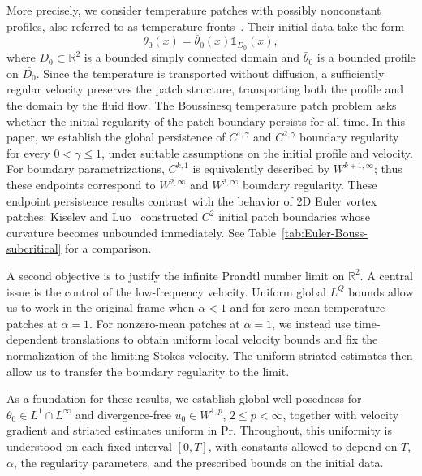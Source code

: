 \documentclass[reqno,11pt,a4paper]{amsart}
\begin{document}
More precisely, we consider temperature patches
with possibly nonconstant profiles,
also referred to as temperature fronts~\cite{Gil82,AJM03}.
Their initial data take the form 
\[
  \theta_0(x)=\bar\theta_0(x)\mathds{1}_{D_0}(x),
\]
where $D_0\subset\mathbb R^2$ is a bounded simply connected
domain and $\bar\theta_0$ is a bounded profile on
$\overline{D_0}$.
Since the temperature is transported without diffusion,
a sufficiently regular velocity preserves the patch structure,
transporting both the profile and the domain by the fluid flow.
The Boussinesq temperature patch problem asks whether
the initial regularity of the patch boundary persists
for all time.
In this paper, we establish the global persistence of
$C^{1,\gamma}$ and $C^{2,\gamma}$ boundary regularity
for every $0<\gamma\leq1$, under suitable assumptions
on the initial profile and velocity.
For boundary parametrizations, $C^{k,1}$ is equivalently described by $W^{k+1,\infty}$; 
thus these endpoints correspond to $W^{2,\infty}$ and $W^{3,\infty}$ boundary regularity.
These endpoint persistence results contrast with
the behavior of 2D Euler vortex patches:
Kiselev and Luo~\cite{KL23} constructed
$C^2$ initial patch boundaries whose curvature
becomes unbounded immediately.
See Table~\ref{tab:Euler-Bouss-subcritical}
for a comparison.

A second objective is to justify the infinite Prandtl
number limit on $\mathbb R^2$.
A central issue is the control of the low-frequency velocity.
Uniform global $L^Q$ bounds allow us to work
in the original frame when $\alpha<1$
and for zero-mean temperature patches at $\alpha=1$.
For nonzero-mean patches at $\alpha=1$,
we instead use time-dependent translations
to obtain uniform local velocity bounds
and fix the normalization of the limiting Stokes velocity.
The uniform striated estimates then allow us
to transfer the boundary regularity to the limit.

As a foundation for these results, we establish
global well-posedness for $\theta_0\in L^1\cap L^\infty$
and divergence-free $u_0\in W^{1,p}$,
$2\leq p<\infty$, together with velocity gradient
and striated estimates uniform in $\mathrm{Pr}$.
Throughout, this uniformity is understood
on each fixed interval $[0,T]$,
with constants allowed to depend on $T$, $\alpha$,
the regularity parameters,
and the prescribed bounds on the initial data.
\end{document}
